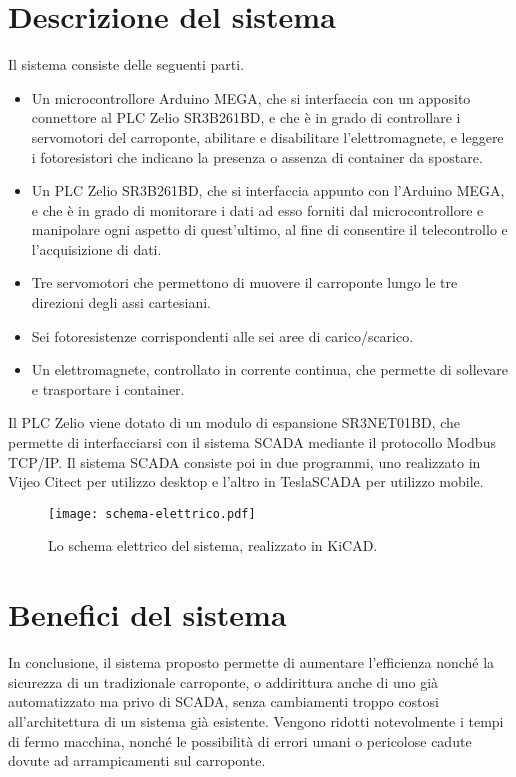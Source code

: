 \section{Descrizione del sistema}

Il sistema consiste delle seguenti parti.
\begin{itemize}
    \item Un microcontrollore Arduino MEGA, che si interfaccia con un apposito connettore al PLC
        Zelio SR3B261BD, e che è in grado di controllare i servomotori del carroponte, abilitare e
        disabilitare l'elettromagnete, e leggere i fotoresistori che indicano la presenza o assenza
        di container da spostare.
    \item Un PLC Zelio SR3B261BD, che si interfaccia appunto con l'Arduino MEGA, e che è in grado di
        monitorare i dati ad esso forniti dal microcontrollore e manipolare ogni aspetto di
        quest'ultimo, al fine di consentire il telecontrollo e l'acquisizione di dati.
    \item Tre servomotori che permettono di muovere il carroponte lungo le tre direzioni
        degli assi cartesiani.
    \item Sei fotoresistenze corrispondenti alle sei aree di carico/scarico.
    \item Un elettromagnete, controllato in corrente continua, che permette di sollevare e trasportare i container.
\end{itemize}

Il PLC Zelio viene dotato di un modulo di espansione SR3NET01BD, che permette di interfacciarsi con
il sistema SCADA mediante il protocollo Modbus TCP/IP. Il sistema SCADA consiste poi in due
programmi, uno realizzato in Vijeo Citect per utilizzo desktop e l'altro in TeslaSCADA per utilizzo
mobile.

\begin{figure*}[htbp]\centering
    \caption{Lo schema elettrico del sistema, realizzato in KiCAD.}
    \texttt{[image: schema-elettrico.pdf]}
\end{figure*}

\section{Benefici del sistema}

In conclusione, il sistema proposto permette di aumentare l'efficienza nonché la sicurezza di un
tradizionale carroponte, o addirittura anche di uno già automatizzato ma privo di SCADA, senza
cambiamenti troppo costosi all'architettura di un sistema già esistente. Vengono ridotti
notevolmente i tempi di fermo macchina, nonché le possibilità di errori umani o pericolose cadute
dovute ad arrampicamenti sul carroponte.

\enlargethispage*{4\baselineskip}

\printbibliography


